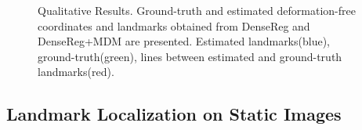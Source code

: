 \begin{figure}[h]

\caption{Qualitative Results. Ground-truth and estimated deformation-free coordinates and  landmarks obtained from DenseReg and DenseReg+MDM are presented. Estimated landmarks(blue), ground-truth(green), lines between estimated and ground-truth landmarks(red).}
\label{fig:qualitative}
\vspace{-0.3cm}

\end{figure}

\subsection{Landmark Localization on Static Images}
\label{sec:exp_landmark_localization}

